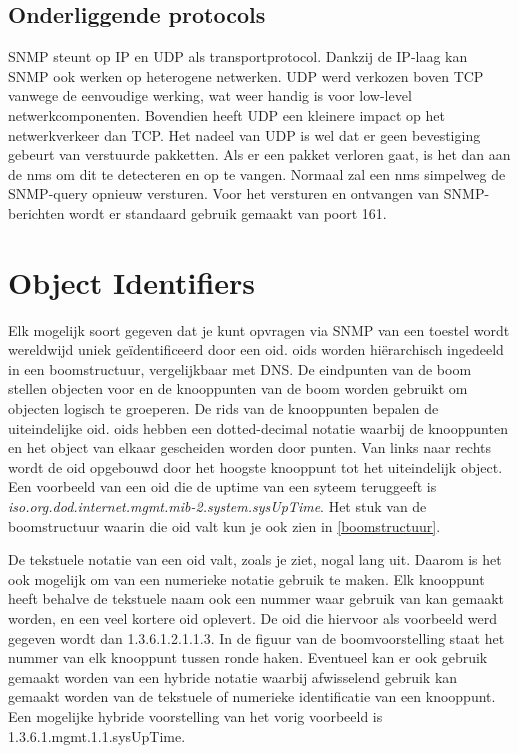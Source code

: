 \subsection{Onderliggende protocols}

SNMP steunt op IP en UDP als transportprotocol. Dankzij de IP-laag kan SNMP ook werken op heterogene netwerken.
UDP werd verkozen boven TCP vanwege de eenvoudige werking, wat weer handig is voor low-level netwerkcomponenten.
Bovendien heeft UDP een kleinere impact op het netwerkverkeer dan TCP\cite{moreau}.
Het nadeel van UDP is wel dat er geen bevestiging gebeurt van verstuurde pakketten.
Als er een pakket verloren gaat, is het dan aan de \gls{nms} om dit te detecteren en op te vangen.
Normaal zal een \gls{nms} simpelweg de SNMP-query opnieuw versturen.
Voor het versturen en ontvangen van SNMP-berichten wordt er standaard gebruik gemaakt van poort 161.


\section{Object Identifiers}

Elk mogelijk soort gegeven dat je kunt opvragen via SNMP van een toestel wordt wereldwijd uniek geïdentificeerd\cite{moreau} door een \gls{oid}.
\glspl{oid} worden hiërarchisch ingedeeld in een boomstructuur, vergelijkbaar met DNS. De eindpunten van de boom stellen objecten voor en de knooppunten van de boom
worden gebruikt om objecten logisch te groeperen. De \glspl{rid} van de knooppunten bepalen de uiteindelijke \gls{oid}.
\glspl{oid} hebben een dotted-decimal notatie waarbij de knooppunten en het object van elkaar gescheiden worden door punten. %
Van links naar rechts wordt de \gls{oid} opgebouwd door het hoogste knooppunt tot het uiteindelijk object.
Een voorbeeld van een \gls{oid} die de uptime van een syteem teruggeeft is \textit{iso.org.dod.internet.mgmt.mib-2.system.sysUpTime}.
Het stuk van de boomstructuur waarin die \gls{oid} valt kun je ook zien in \cref{boomstructuur}.

De tekstuele notatie van een \gls{oid} valt, zoals je ziet, nogal lang uit.
Daarom is het ook mogelijk om van een numerieke notatie gebruik te maken.
Elk knooppunt heeft behalve de tekstuele naam ook een nummer waar gebruik van kan gemaakt worden, en een veel kortere \gls{oid} oplevert.
De \gls{oid} die hiervoor als voorbeeld werd gegeven wordt dan 1.3.6.1.2.1.1.3.
In de figuur van de boomvoorstelling staat het nummer van elk knooppunt tussen ronde haken. Eventueel kan er ook gebruik gemaakt worden van een
hybride notatie waarbij afwisselend gebruik kan gemaakt worden van de tekstuele of numerieke identificatie van een knooppunt.
Een mogelijke hybride voorstelling van het vorig voorbeeld is 1.3.6.1.mgmt.1.1.sysUpTime.

